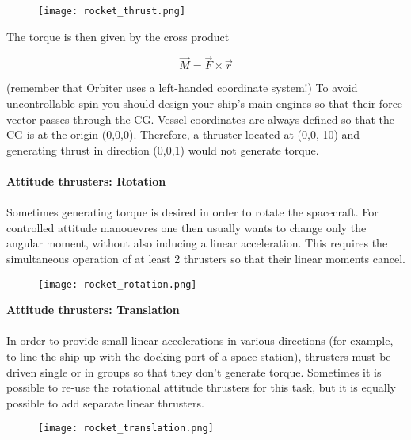 \documentclass[Orbiter Developer Manual.tex]{subfiles}
\begin{document}
\begin{figure}[H]
  \centering
  \texttt{[image: rocket\_thrust.png]}
\end{figure}

\noindent
The torque is then given by the cross product

\[ \vec{M} = \vec{F} \times \vec{r} \]

\noindent
(remember that Orbiter uses a left-handed coordinate system!) To avoid uncontrollable spin you should design your ship’s main engines so that their force vector passes through the CG. Vessel coordinates are always defined so that the CG is at the origin (0,0,0). Therefore, a thruster located at (0,0,-10) and generating thrust in direction (0,0,1) would not generate torque.\\
\\
\textbf{Attitude thrusters: Rotation}\\
\\
Sometimes generating torque is desired in order to rotate the spacecraft. For controlled attitude manouevres one then usually wants to change only the angular moment, without also inducing a linear acceleration. This requires the simultaneous operation of at least 2 thrusters so that their linear moments cancel.

\begin{figure}[H]
  \centering
  \texttt{[image: rocket\_rotation.png]}
\end{figure}

\noindent
\textbf{Attitude thrusters: Translation}\\
\\
In order to provide small linear accelerations in various directions (for example, to line the ship up with the docking port of a space station), thrusters must be driven single or in groups so that they don’t generate torque. Sometimes it is possible to re-use the rotational attitude thrusters for this task, but it is equally possible to add separate linear thrusters.\\

\begin{figure}[H]
  \centering
  \texttt{[image: rocket\_translation.png]}
\end{figure}
\end{document}
